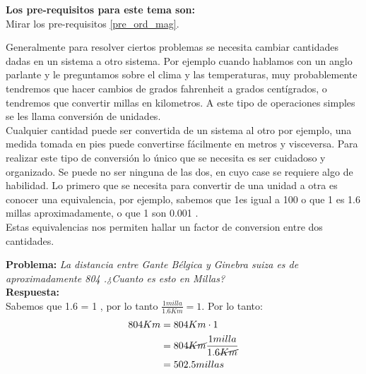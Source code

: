 \label{sec_Conversion_unidades}
\begin{prere}
\begin{tcolorbox}[colback=blue!5!white,colframe=blue!75!black,boxrule=0.5pt,arc=4pt, left=6pt,right=6pt,top=6pt,bottom=6pt,boxsep=0pt] 
  \textbf{Los pre-requisitos para este tema son:}\\
  Mirar los pre-requisitos \ref{pre_ord_mag}.
\end{tcolorbox} 
\label{pre_Conv_U}
\end{prere}
Generalmente para resolver ciertos problemas se necesita cambiar cantidades dadas en un sistema a otro sistema. Por ejemplo cuando hablamos con un anglo parlante y le preguntamos sobre el clima y las temperaturas, muy probablemente tendremos que hacer cambios de grados fahrenheit a grados cent\'igrados, o tendremos que convertir millas en kilometros. A este tipo de operaciones simples se les llama conversi\'on de unidades.\\
Cualquier cantidad puede ser convertida de un sistema al otro por ejemplo, una medida tomada en pies puede convertirse f\'acilmente en metros y visceversa. Para realizar este tipo de conversi\'on lo \'unico que se necesita es ser cuidadoso y organizado. Se puede no ser ninguna de las dos, en cuyo case se requiere algo de habilidad. Lo primero que se necesita para convertir de una unidad a otra es conocer una equivalencia, por ejemplo, sabemos que 1\m es igual a 100 \cm o que 1 \km es 1.6 millas aproximadamente, o que 1 \ms son 0.001 \s.\\
Estas equivalencias nos permiten hallar un factor de conversion entre dos cantidades.
\begin{example}
\begin{tcolorbox}[colback=green!5!white,colframe=green!75!black,boxrule=0.5pt,arc=4pt,left=6pt,right=6pt,top=6pt,bottom=6pt,boxsep=0pt]
\textbf{Problema:} \textit{La distancia entre Gante B\'elgica y Ginebra suiza es de aproximadamente 804 \km.¿Cuanto es esto en Millas? }\\
\textbf{Respuesta:}\\ 
Sabemos que 1.6 \km = 1 \mile, por lo tanto $\frac{1 milla}{1.6 Km} = 1$. Por lo tanto:\\
\begin{align}
804 Km & = 804 Km \cdot 1 \\
       & = 804 \cancel{Km} \frac{1 milla}{1.6 \cancel{Km}}\\
       & = 502.5 millas
\end{align}
\end{tcolorbox}
\end{example}  
